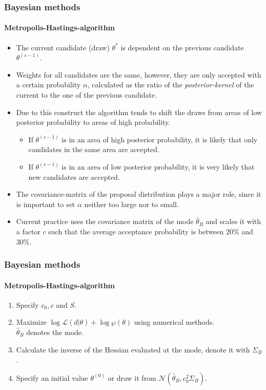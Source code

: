 \documentclass[handout]{beamer}  %
\newcounter{saveenumi}
\newcommand{\seti}{\setcounter{saveenumi}{\value{enumi}}}
\begin{document}
\begin{frame}\frametitle{Bayesian methods}\framesubtitle{Metropolis-Hastings-algorithm}
	\begin{itemize}
		\item The current candidate (draw) ${\theta^*}$ is dependent on the previous candidate ${\theta^{(s-1)}}$.
		\item Weights for all candidates are the same, however, they are only accepted with a certain probability $\alpha$, calculated as the ratio of the \emph{posterior-kernel} of the current to the one of the previous candidate.
		\item Due to this construct the algorithm tends to shift the draws from areas of low posterior probability to areas of high probability.
		\begin{itemize}
			\item If ${\theta^{(s-1)}}$ is in an area of high posterior probability, it is likely that only candidates in the same area are accepted.
			\item If ${\theta^{(s-1)}}$ is in an area of low posterior probability, it is very likely that new candidates are accepted.
		\end{itemize}
		\item The covariance-matrix of the proposal distribution plays a major role, since it is important to set $\alpha$ neither too large nor to small.
		\item Current practice uses the covariance matrix of the mode ${\widehat{\theta}_B}$ and scales it with a factor $c$ such that the average acceptance probability is between 20\% and 30\%.
	\end{itemize}
	
\end{frame}

\begin{frame}\frametitle{Bayesian methods}\framesubtitle{Metropolis-Hastings-algorithm}
	\begin{enumerate}
		\item Specify $c_0,c$ and $S$.
		\item Maximize $\log{\mathcal{L}({d}|{\theta})} +
		\log{\wp({\theta})}$ using numerical methods.\\
		${\widehat{\theta}_B}$ denotes the mode.
		\item Calculate the inverse of the Hessian evaluated at the mode, denote it with ${\Sigma_B}$.
		\item Specify an initial value ${\theta^{(0)}}$ or draw it from
		$\mathcal{N}({\widehat{\theta}_B},c_0^2{\Sigma_B})$.
		\seti
	\end{enumerate}
	
\end{frame}
\end{document}
